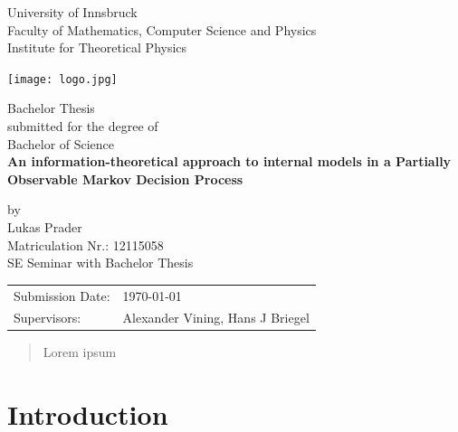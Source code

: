 \documentclass[12pt,a4paper]{article}
\begin{document}
\def\findate{\today}


\thispagestyle{empty}
\begin{center}
    \Large{University of Innsbruck \\ Faculty of Mathematics, Computer Science and Physics} \\
    \vspace{3mm}
    \large{Institute for Theoretical Physics}
    \vspace{10mm}

    \texttt{[image: logo.jpg]}

    \vspace{10mm}
    \Large{Bachelor Thesis} \\
    \large{submitted for the degree of} \\
    \Large{Bachelor of Science} \\
    \vspace{10mm}
    \LARGE{\textbf{An information-theoretical approach to internal models in a Partially Observable Markov Decision Process}} \\
    \vspace{10mm}

    \large{by \\ Lukas Prader \\ Matriculation Nr.: 12115058 \\ SE Seminar with Bachelor Thesis}
\end{center}

\vspace{30mm}
\begin{tabular}{ll}
    \large{Submission Date:} & \large{\findate}                          \\
    \large{Supervisors:}     & \large{Alexander Vining, Hans J  Briegel} \\
\end{tabular}


\newpage
\thispagestyle{empty}
\begin{abstract}
    Lorem ipsum
\end{abstract}


\newpage
\tableofcontents
\thispagestyle{empty}
\newpage
{}

\section{Introduction} \label{sec:introduction}
\end{document}
